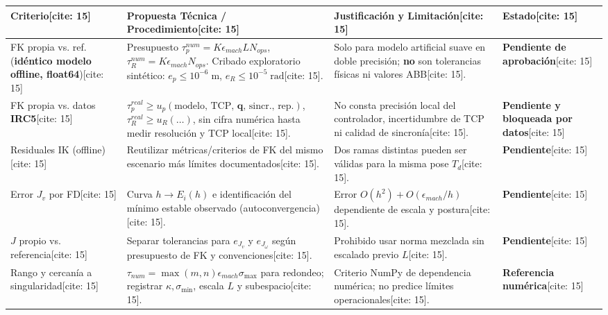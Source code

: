 \documentclass[10pt, a4paper]{article}
\begin{document}
\vspace{0.15cm}
\noindent
{\scriptsize
\renewcommand{\arraystretch}{1.28}
\noindent\begin{tabularx}{\textwidth}{|>{\hsize=0.75\hsize\raggedright\arraybackslash}X|>{\hsize=1.25\hsize\raggedright\arraybackslash}X|>{\hsize=1.25\hsize\raggedright\arraybackslash}X|>{\hsize=0.75\hsize\raggedright\arraybackslash}X|}
\hline
\rowcolor{ucbblue!15}
\textbf{Criterio}[cite: 15] & \textbf{Propuesta Técnica / Procedimiento}[cite: 15] & \textbf{Justificación y Limitación}[cite: 15] & \textbf{Estado}[cite: 15] \\ \hline
FK propia vs. ref. (\textbf{idéntico modelo offline, float64})[cite: 15] & Presupuesto $\tau_p^{num} = K\epsilon_{mach} L N_{ops}$, $\tau_R^{num} = K\epsilon_{mach} N_{ops}$. Cribado exploratorio sintético: $e_p \le 10^{-6}\;\mathrm{m}$, $e_R \le 10^{-5}\;\mathrm{rad}$[cite: 15]. & Solo para modelo artificial suave en doble precisión; \textbf{no} son tolerancias físicas ni valores ABB[cite: 15]. & \textbf{Pendiente de aprobación}[cite: 15] \\ \hline
FK propia vs. datos \textbf{IRC5}[cite: 15] & $\tau_p^{real} \ge u_p(\text{modelo, TCP, }\mathbf{q}\text{, sincr., rep.})$, $\tau_R^{real} \ge u_R(\dots)$, sin cifra numérica hasta medir resolución y TCP local[cite: 15]. & No consta precisión local del controlador, incertidumbre de TCP ni calidad de sincronía[cite: 15]. & \textbf{Pendiente y bloqueada por datos}[cite: 15] \\ \hline
Residuales IK (offline)[cite: 15] & Reutilizar métricas/criterios de FK del mismo escenario más límites documentados[cite: 15]. & Dos ramas distintas pueden ser válidas para la misma pose $T_d$[cite: 15]. & \textbf{Pendiente}[cite: 15] \\ \hline
Error $J_v$ por FD[cite: 15] & Curva $h \to E_i(h)$ e identificación del mínimo estable observado (autoconvergencia)[cite: 15]. & Error $O(h^2) + O(\epsilon_{mach}/h)$ dependiente de escala y postura[cite: 15]. & \textbf{Pendiente}[cite: 15] \\ \hline
$J$ propio vs. referencia[cite: 15] & Separar tolerancias para $e_{J_v}$ y $e_{J_\omega}$ según presupuesto de FK y convenciones[cite: 15]. & Prohibido usar norma mezclada sin escalado previo $L$[cite: 15]. & \textbf{Pendiente}[cite: 15] \\ \hline
Rango y cercanía a singularidad[cite: 15] & $\tau_{num} = \max(m,n)\epsilon_{mach}\sigma_{\max}$ para redondeo; registrar $\kappa, \sigma_{\min}$, escala $L$ y subespacio[cite: 15]. & Criterio NumPy de dependencia numérica; no predice límites operacionales[cite: 15]. & \textbf{Referencia numérica}[cite: 15] \\ \hline
\end{tabularx}
}
\end{document}
